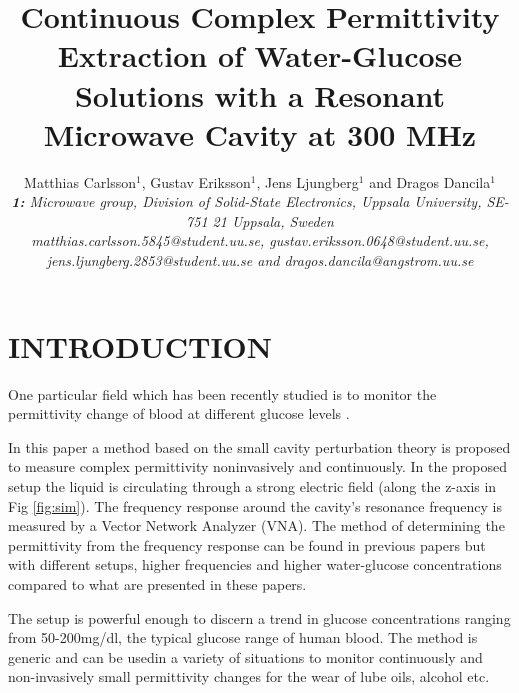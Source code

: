 \documentclass[10pt,final,conference,a4paper,twocolumn]{IEEEtran_AntennEMB_GigaHertz2016}
\begin{document}
\title{Continuous Complex Permittivity Extraction of Water-Glucose Solutions with a Resonant Microwave Cavity at 300 MHz}

\author{Matthias Carlsson$^1$, Gustav Eriksson$^1$, Jens Ljungberg$^1$ and Dragos Dancila$^1$ \\
\em \small \textbf{1:} Microwave group, Division of Solid-State Electronics, Uppsala University, SE-751 21 Uppsala, Sweden\\
\small matthias.carlsson.5845@student.uu.se, gustav.eriksson.0648@student.uu.se, \\
\small jens.ljungberg.2853@student.uu.se and dragos.dancila@angstrom.uu.se
}

\maketitle
\section{INTRODUCTION}
One particular field which has been recently studied is to monitor the permittivity change of blood at different glucose levels \cite{c2}. 
 
 In this paper a method based on the small cavity perturbation theory \cite{c3} is proposed to measure complex permittivity noninvasively and continuously. In the proposed setup the liquid is circulating through a strong electric field (along the z-axis in Fig \ref{fig:sim}). The frequency response around the cavity's resonance frequency is measured by a Vector Network Analyzer (VNA). The method of determining the permittivity from the frequency response can be found in previous papers \cite{c2}\cite{c1} but with different setups, higher frequencies and higher water-glucose concentrations compared to what are presented in these papers.
 
 The setup is powerful enough to discern a trend in glucose concentrations ranging from 50-200mg/dl, the typical glucose range of human blood. The method is generic and can be usedin a variety of situations to monitor continuously and non-invasively small permittivity changes for the wear of lube oils, alcohol etc.
\end{document}
